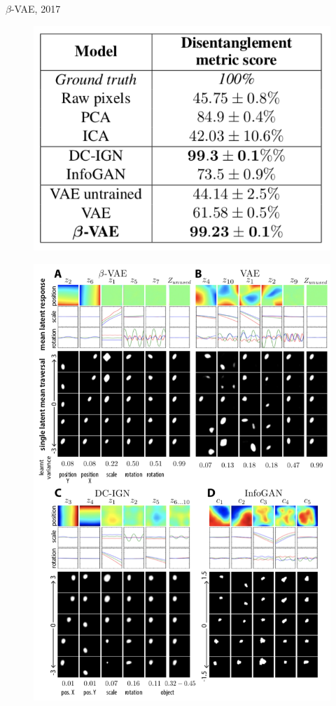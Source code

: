 \documentclass{beamer}
\begin{document}
\begin{frame}{$\beta$-VAE, 2017}
	\begin{minipage}[t]{0.5\columnwidth}
	    \vspace{1.5cm}
		\begin{figure}
			\centering
			\includegraphics[width=1.\linewidth]{figs/betaVAE_4.png}
		\end{figure}
	\end{minipage}%
	\begin{minipage}[t]{0.5\columnwidth}
		\begin{figure}[h]
			\centering
			\includegraphics[width=.95\linewidth]{figs/betaVAE_5.png}

\end{figure}
\end{minipage}
\end{frame}
\end{document}
